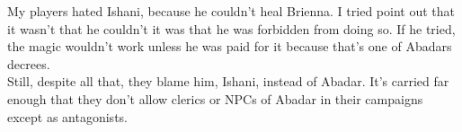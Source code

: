 My players hated Ishani, because he couldn't heal Brienna. I tried point out that it wasn't that he couldn't it was that he was forbidden from doing so. If he tried, the magic wouldn't work unless he was paid for it because that's one of Abadars decrees.\\

Still, despite all that, they blame him, Ishani, instead of Abadar. It's carried far enough that they don't allow clerics or NPCs of Abadar in their campaigns except as antagonists.\\

